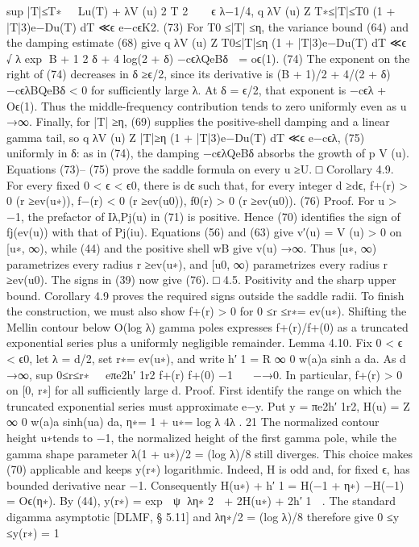 sup
|T|≤T∗
Lu(T) + λV (u)
2
T 2
 ≪ϵ λ−1/4,
q
λV (u)
Z
T∗≤|T|≤T0
(1 + |T|3)e−Du(T) dT ≪ϵ e−cϵK2.
(73)
For T0 ≤|T| ≤η, the variance bound (64) and the damping estimate (68) give
q
λV (u)
Z
T0≤|T|≤η
(1 + |T|3)e−Du(T) dT
≪ϵ
√
λ exp
B + 1
2
δ + 4 log(2 + δ) −cϵλQeBδ

= oϵ(1).
(74)
The exponent on the right of (74) decreases in δ ≥ϵ/2, since its derivative is (B + 1)/2 + 4/(2 +
δ) −cϵλBQeBδ < 0 for suﬃciently large λ. At δ = ϵ/2, that exponent is −cϵλ + Oϵ(1). Thus
the middle-frequency contribution tends to zero uniformly even as u →∞.
Finally, for |T| ≥η, (69) supplies the positive-shell damping and a linear gamma tail, so
q
λV (u)
Z
|T|≥η
(1 + |T|3)e−Du(T) dT ≪ϵ e−cϵλ,
(75)
uniformly in δ: as in (74), the damping −cϵλQeBδ absorbs the growth of
p
V (u). Equations
(73)– (75) prove the saddle formula on every u ≥U.
□
Corollary 4.9. For every ﬁxed 0 < ϵ < ϵ0, there is dϵ such that, for every integer d ≥dϵ,
f+(r) > 0
(r ≥ev(u∗)),
f−(r) < 0
(r ≥ev(u0)),
f0(r) > 0
(r ≥ev(u0)).
(76)
Proof. For u > −1, the prefactor of Iλ,Pj(u) in (71) is positive. Hence (70) identiﬁes the sign
of fj(ev(u)) with that of Pj(iu). Equations (56) and (63) give v′(u) = V (u) > 0 on [u∗, ∞),
while (44) and the positive shell wB give v(u) →∞. Thus [u∗, ∞) parametrizes every radius
r ≥ev(u∗), and [u0, ∞) parametrizes every radius r ≥ev(u0). The signs in (39) now give (76).
□
4.5. Positivity and the sharp upper bound. Corollary 4.9 proves the required signs outside
the saddle radii. To ﬁnish the construction, we must also show f+(r) > 0 for 0 ≤r ≤r∗= ev(u∗).
Shifting the Mellin contour below O(log λ) gamma poles expresses f+(r)/f+(0) as a truncated
exponential series plus a uniformly negligible remainder.
Lemma 4.10. Fix 0 < ϵ < ϵ0, let λ = d/2, set r∗= ev(u∗), and write h′
1 =
R ∞
0 w(a)a sinh a da.
As d →∞,
sup
0≤r≤r∗
eπe2h′
1r2 f+(r)
f+(0) −1
 −→0.
In particular, f+(r) > 0 on [0, r∗] for all suﬃciently large d.
Proof. First identify the range on which the truncated exponential series must approximate e−y.
Put
y = πe2h′
1r2,
H(u) =
Z ∞
0
w(a)a sinh(ua) da,
η∗= 1 + u∗= log λ
4λ .
21
The normalized contour height u∗tends to −1, the normalized height of the ﬁrst gamma pole,
while the gamma shape parameter λ(1 + u∗)/2 = (log λ)/8 still diverges. This choice makes
(70) applicable and keeps y(r∗) logarithmic. Indeed, H is odd and, for ﬁxed ϵ, has bounded
derivative near −1. Consequently
H(u∗) + h′
1 = H(−1 + η∗) −H(−1) = Oϵ(η∗).
By (44),
y(r∗) = exp

ψ
λη∗
2

+ 2H(u∗) + 2h′
1

.
The standard digamma asymptotic [DLMF, § 5.11] and λη∗/2 = (log λ)/8 therefore give
0 ≤y ≤y(r∗) = 1
